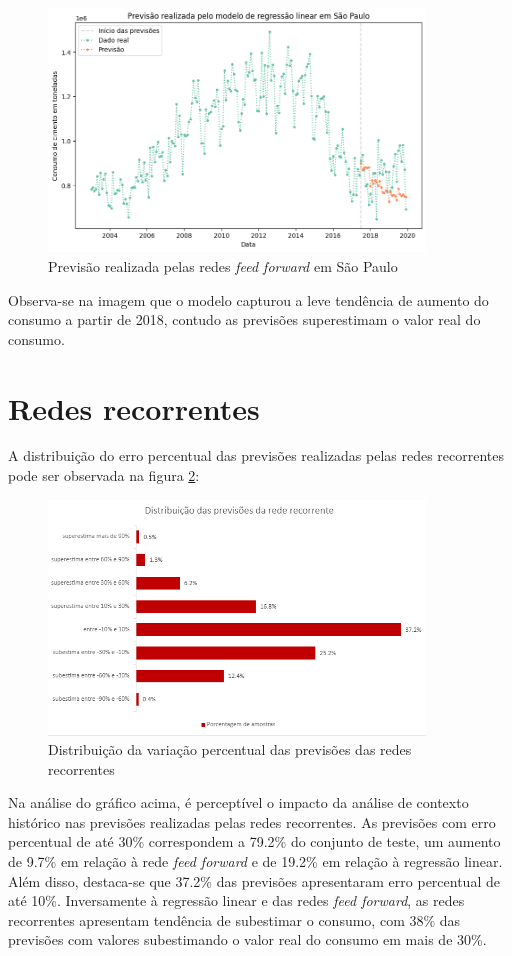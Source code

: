 \begin{figure}[H]
    \centering
    \includegraphics[width=10cm]{../figuras/graficos/mlp/prev_sp.png}
    \caption{Previsão realizada pelas redes \textit{feed forward} em São Paulo}
    \label{img:consumo-sp-rff}
\end{figure}

Observa-se na imagem que o modelo capturou a leve tendência de aumento do 
consumo a partir de 2018, contudo as previsões superestimam o valor real 
do consumo.

\section{Redes recorrentes}

A distribuição do erro percentual das previsões realizadas pelas redes 
recorrentes pode ser observada na figura \ref{img:erro-perc-rnn}:

\begin{figure}[H]
    \centering
    \includegraphics[width=10cm]{../figuras/graficos/rnn/erro-perc-rnn.png}
    \caption{Distribuição da variação percentual das previsões das redes recorrentes}
    \label{img:erro-perc-rnn}
\end{figure}

Na análise do gráfico acima, é perceptível o impacto da análise de contexto histórico 
nas previsões realizadas pelas redes recorrentes. As previsões com erro percentual 
de até 30\% correspondem a 79.2\% do conjunto de teste, um aumento de 9.7\% em 
relação à rede \textit{feed forward} e de 19.2\% em relação à regressão linear.
Além disso, destaca-se que 37.2\% das previsões apresentaram erro percentual 
de até 10\%. Inversamente à regressão linear e das redes \textit{feed forward},
as redes recorrentes apresentam tendência de subestimar o consumo, com 38\% das
previsões com valores subestimando o valor real do consumo em mais de 30\%.

